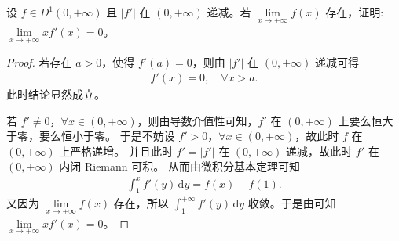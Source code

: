 \documentclass[../../main.tex]{subfiles}
\begin{document}
\begin{example}
设 \(f\in D^{1}(0,+\infty)\) 且 \(|f'|\) 在 \((0,+\infty)\) 递减。若 \(\lim\limits_{x \to +\infty} f(x)\) 存在，证明: \(\lim\limits_{x \to +\infty} x f'(x)=0\)。 
\end{example}
\begin{proof}
若存在 \(a > 0\)，使得 \(f'(a) = 0\)，则由 \(|f'|\) 在 \((0, +\infty)\) 递减可得
\begin{align*}
f'(x) = 0, \quad \forall x > a.
\end{align*}
此时结论显然成立。

若 \(f' \neq 0\)，\(\forall x \in (0, +\infty)\)，则由导数介值性可知，\(f'\) 在 \((0, +\infty)\) 上要么恒大于零，要么恒小于零。
于是不妨设 \(f' > 0\)，\(\forall x \in (0, +\infty)\)，故此时 \(f\) 在 \((0, +\infty)\) 上严格递增。
并且此时 \(f' = |f'|\) 在 \((0, +\infty)\) 递减，故此时 \(f'\) 在 \((0, +\infty)\) 内闭 Riemann 可积。
从而由微积分基本定理可知
\begin{align*}
\int_1^x f'(y) \, \mathrm{d}y = f(x) - f(1).
\end{align*}
又因为 \(\lim\limits_{x \to +\infty} f(x)\) 存在，所以 \(\int_1^{+\infty} f'(y) \, \mathrm{d}y\) 收敛。于是由可知 \(\lim\limits_{x \to +\infty} x f'(x) = 0\)。
\end{proof}
\end{document}
